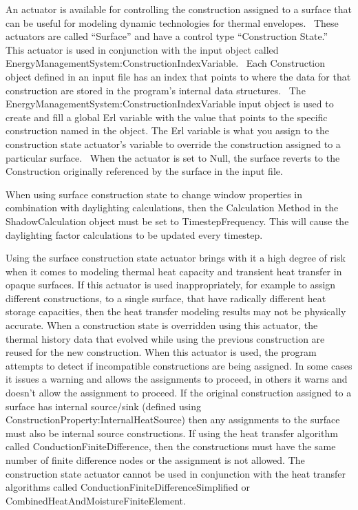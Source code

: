 An actuator is available for controlling the construction assigned to a surface that can be useful for modeling dynamic technologies for thermal envelopes.~ These actuators are called ``Surface'' and have a control type ``Construction State.''~ This actuator is used in conjunction with the input object called EnergyManagementSystem:ConstructionIndexVariable.~ Each Construction object defined in an input file has an index that points to where the data for that construction are stored in the program's internal data structures.~ The EnergyManagementSystem:ConstructionIndexVariable input object is used to create and fill a global Erl variable with the value that points to the specific construction named in the object. The Erl variable is what you assign to the construction state actuator's variable to override the construction assigned to a particular surface.~ When the actuator is set to Null, the surface reverts to the Construction originally referenced by the surface in the input file.

When using surface construction state to change window properties in combination with daylighting calculations, then the Calculation Method in the ShadowCalculation object must be set to TimestepFrequency. This will cause the daylighting factor calculations to be updated every timestep.

Using the surface construction state actuator brings with it a high degree of
risk when it comes to modeling thermal heat capacity and transient heat
transfer in opaque surfaces. If this actuator is used inappropriately, for
example to assign different constructions, to a single surface, that have
radically different heat storage capacities, then the heat transfer modeling
results may not be physically accurate. When a construction state is overridden
using this actuator, the thermal history data that evolved while using the
previous construction are reused for the new construction. When this actuator
is used, the program attempts to detect if incompatible constructions are being
assigned. In some cases it issues a warning and allows the assignments to
proceed, in others it warns and doesn't allow the assignment to proceed. If the
original construction assigned to a surface has internal source/sink (defined
using ConstructionProperty:InternalHeatSource) then any assignments to the
surface must also be internal source constructions. If using the heat transfer
algorithm called ConductionFiniteDifference, then the constructions must have
the same number of finite difference nodes or the assignment is not allowed.
The construction state actuator cannot be used in conjunction with the heat
transfer algorithms called ConductionFiniteDifferenceSimplified or
CombinedHeatAndMoistureFiniteElement.

